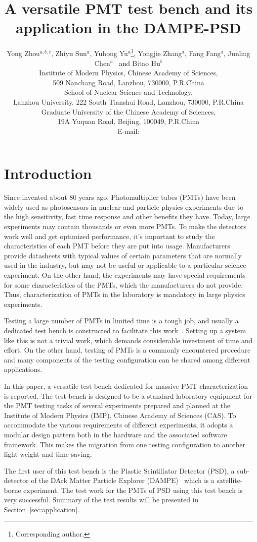 \documentclass{JINST}
\title{A versatile PMT test bench and its application in the DAMPE-PSD}
\author{Yong Zhou$^{a,b,c}$,
Zhiyu Sun$^a$,
Yuhong Yu$^a$\thanks{Corresponding author.},
Yongjie Zhang$^a$,
Fang Fang$^a$,
Junling Chen$^a$~
and Bitao Hu$^b$\\
\llap{$^a$}Institute of Modern Physics, Chinese Academy of Sciences,\\
           509 Nanchang Road, Lanzhou, 730000, P.R.China\\
\llap{$^b$}School of Nuclear Science and Technology,\\
           Lanzhou University, 222 South Tianshui Road, Lanzhou, 730000, P.R.China\\
\llap{$^c$}Graduate University of the Chinese Academy of Sciences,\\
           19A Yuquan Road, Beijing, 100049, P.R.China\\
E-mail: \email{yuyuhong@impcas.ac.cn}}
\begin{document}
\section{Introduction}
\label{sec:introduction}

Since invented about 80 years ago, Photomultiplier tubes (PMTs) have been widely used as photosensors in nuclear and particle physics experiments due to the high sensitivity, fast time response and other benefits they have. 
Today, large experiments may contain thousands or even more PMTs. To make the detectors work well and get optimized performance, it's important to study the characteristics of each PMT before they are put into usage. 
Manufacturers provide datasheets with typical values of certain parameters that are normally used in the industry, but may not be useful or applicable to a particular science experiment.
On the other hand, the experiments may have special requirements for some characteristics of the PMTs, which the manufacturers do not provide. 
Thus, characterization of PMTs in the laboratory is mandatory in large physics experiments.

Testing a large number of PMTs in limited time is a tough job, and usually a dedicated test bench is constructed to facilitate this work~\cite{barnhill_testing_2008,akgun_complete_2005,adragna_pmt-block_2006}.
Setting up a system like this is not a trivial work, which demands considerable investment of time and effort.
On the other hand, testing of PMTs is a commonly encountered procedure and many components of the testing configuration can be shared among different applications.

In this paper, a versatile test bench dedicated for massive PMT characterization is reported.
The test bench is designed to be a standard laboratory equipment for the PMT testing tasks of several experiments prepared and planned at the Institute of Modern Physics (IMP), Chinese Academy of Sciences (CAS).
To accommodate the various requirements of different experiments, it adopts a modular design pattern both in the hardware and the associated software framework.
This makes the migration from one testing configuration to another light-weight and time-saving.

The first user of this test bench is the Plastic Scintillator Detector (PSD), a sub-detector of the DArk Matter Particle Explorer (DAMPE)~\cite{Chang_Jin_dampe} which is a satellite-borne experiment. 
The test work for the PMTs of PSD using this test bench is very successful. Summary of the test results will be presented in Section~\ref{sec:application}.
\end{document}
